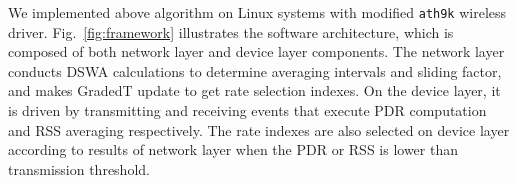 We implemented above algorithm on Linux systems with modified \texttt{ath9k} wireless driver. Fig.~\ref{fig:framework} illustrates the software architecture, which is composed of both network layer and device layer components. The network layer conducts DSWA calculations to determine averaging intervals and sliding factor, and makes GradedT update to get rate selection indexes. On the device layer, it is driven by transmitting and receiving events that execute PDR computation and RSS averaging respectively. The rate indexes are also selected on device layer according to results of network layer when the PDR or RSS is lower than transmission threshold.
